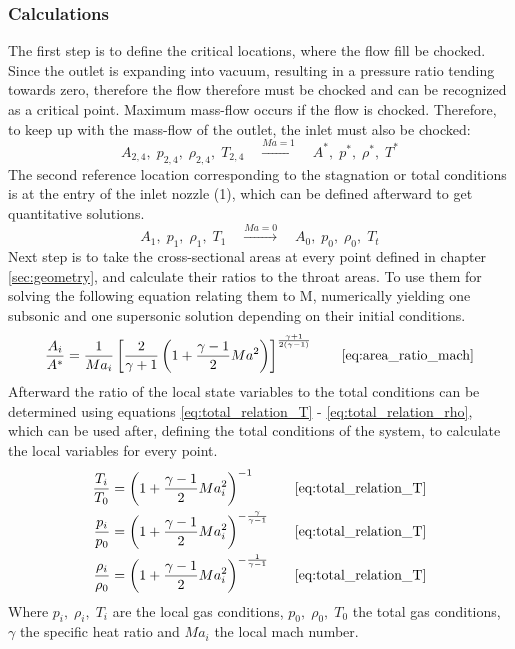 \subsubsection*{Calculations}

	The first step is to define the critical locations, where the flow fill be chocked.
	Since the outlet is expanding into vacuum, resulting in a pressure ratio tending towards zero, therefore the flow therefore must be chocked and can be recognized as a critical point.
	Maximum mass-flow occurs if the flow is chocked. Therefore, to keep up with the mass-flow of the outlet, the inlet must also be chocked: 
	$$
		A_{2,4},\;p_{2,4},\;\rho_{2,4},\;T_{2,4}
			\quad \xrightarrow {Ma = 1} \quad
		A^*,\;p^*,\;\rho^*,\;T^*
	$$
	The second reference location corresponding to the stagnation or total conditions is at the entry of the inlet nozzle (1), which can be defined afterward to get quantitative solutions.
	$$
		A_1,\;p_1,\;\rho_1,\;T_1
			\quad \xrightarrow{Ma=0} \quad
		A_0,\;p_0,\;\rho_0,\;T_t
	$$
	Next step is to take the cross-sectional areas at every point defined in chapter \ref{sec:geometry}, and calculate their ratios to the throat areas.
	To use them for solving the following equation relating them to M, numerically yielding one subsonic and one supersonic solution depending on their initial conditions.
	$$
		\frac{A_i}{A^*} = \frac{1}{Ma_i} \left[ \frac{2}{\gamma + 1} \left( 1 + \frac{\gamma - 1}{2} Ma^2 \right) \right]^{\frac{\gamma + 1}{2(\gamma - 1)}}
		\qquad \eqref{eq:area_ratio_mach}
	$$
	Afterward the ratio of the local state variables to the total conditions can be determined using equations \eqref{eq:total_relation_T} - \eqref{eq:total_relation_rho}, which can be used after, defining the total conditions of the system, to calculate the local variables for every point.
	\cite{hall_isentropic_nodate}
	\begin{alignat*}{2}
	    \frac{T_i}{T_0}   & = \left( 1 + \frac{\gamma - 1}{2} Ma_i^2 \right)^{-1}\qquad &\eqref{eq:total_relation_T}\\
	    \frac{p_i}{p_0}   & = \left( 1 + \frac{\gamma - 1}{2} Ma_i^2 \right)^{-\frac{\gamma}{\gamma - 1}}&\eqref{eq:total_relation_T}\\
	    \frac{\rho_i}{\rho_0} & = \left( 1 + \frac{\gamma - 1}{2} Ma_i^2 \right)^{-\frac{1}{\gamma - 1}}&\eqref{eq:total_relation_T}
	\end{alignat*}
	Where $p_i,\; \rho_i,\; T_i$ are the local gas conditions, $p_0,\; \rho_0,\; T_0$ the total gas conditions, $\gamma$ the specific heat ratio and $Ma_i$ the local mach number.
